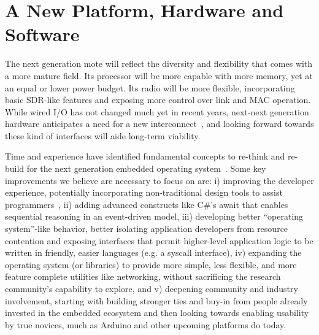 \section{A New Platform, Hardware and Software}

The next generation mote will reflect the diversity and flexibility that comes
with a more mature field. Its processor will be more capable with more memory,
yet at an equal or lower power budget. Its radio will be more flexible,
incorporating basic SDR-like features and exposing more control over link and
MAC operation. While wired I/O has not changed much yet in recent years,
next-next generation hardware anticipates a need for a new
interconnect~\cite{kuo14mbus}, and looking forward towards these kind of
interfaces will aide long-term viability.

Time and experience have identified fundamental concepts to re-think and
re-build for the next generation embedded operating
system~\cite{tinyos-retrospective}. Some key improvements we believe are
necessary to focus on are: i) improving the developer experience, potentially
incorporating non-traditional design tools to assist
programmers~\cite{brown-bubbles}, ii) adding advanced constructs like C\#'s
await that enables sequential reasoning in an event-driven model, iii) developing
better ``operating system''-like behavior, better isolating application
developers from resource contention and exposing interfaces that permit
higher-level application logic to be written in friendly, easier languages
(e.g. a syscall interface), iv) expanding the operating system (or libraries)
to provide more simple, less flexible, and more feature complete utilities
like networking, without sacrificing the research community's capability to
explore, and v) deepening community and industry
involvement, starting with building stronger ties and buy-in from people
already invested in the embedded ecosystem and then looking towards enabling
usability by true novices, much as Arduino and other upcoming platforms do
today.

